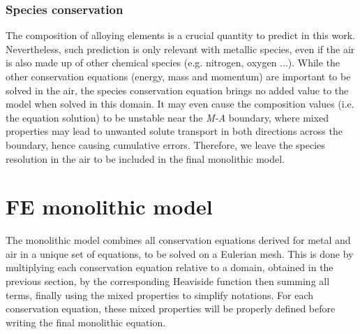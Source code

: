 \subsubsection{Species conservation} \label{sec:solute_air}
The composition of alloying elements is a crucial quantity to predict in this work. 
Nevertheless, such prediction is only relevant with metallic species, even if the air 
is also made up of other chemical species (e.g. nitrogen, oxygen ...). 
While the other conservation equations (energy, mass and momentum) are important to be solved in the air, 
the species conservation equation brings no added value to the model when solved in this domain. 
It may even cause the composition values (i.e. the equation solution) to be unstable near the \emph{M-A} boundary, where mixed properties
may lead to unwanted solute transport in both directions across the boundary, hence causing cumulative errors.
Therefore, we leave the species resolution in the air to be included in the final monolithic model.

\section{FE monolithic model} 
The monolithic model combines all conservation equations derived for metal and air in a unique set of equations, to be solved on a Eulerian mesh.
This is done by multiplying each conservation equation relative to a domain, obtained in the previous section, by the corresponding Heaviside
function then summing all terms, finally using the mixed properties to simplify notations.
For each conservation equation, these mixed properties will be properly defined before writing the final monolithic equation.

